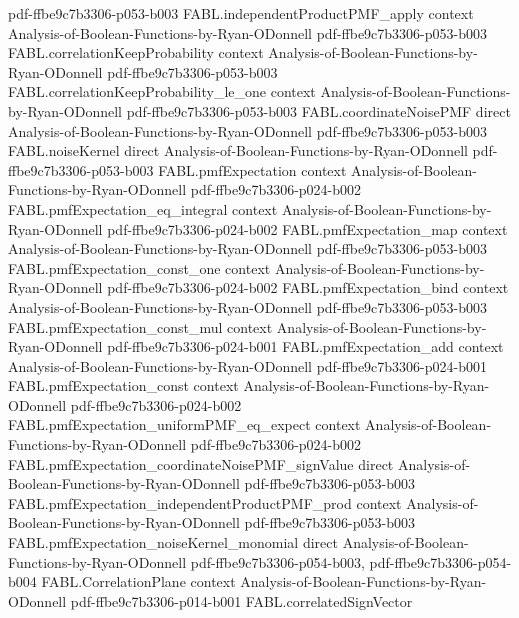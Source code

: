 \begin{theorem}
  {pdf-ffbe9c7b3306-p053-b003}
\proofstep
  {FABL.independentProductPMF_apply}
  {context}
  {Analysis-of-Boolean-Functions-by-Ryan-ODonnell}
  {pdf-ffbe9c7b3306-p053-b003}
\proofstep
  {FABL.correlationKeepProbability}
  {context}
  {Analysis-of-Boolean-Functions-by-Ryan-ODonnell}
  {pdf-ffbe9c7b3306-p053-b003}
\proofstep
  {FABL.correlationKeepProbability_le_one}
  {context}
  {Analysis-of-Boolean-Functions-by-Ryan-ODonnell}
  {pdf-ffbe9c7b3306-p053-b003}
\proofstep
  {FABL.coordinateNoisePMF}
  {direct}
  {Analysis-of-Boolean-Functions-by-Ryan-ODonnell}
  {pdf-ffbe9c7b3306-p053-b003}
\proofstep
  {FABL.noiseKernel}
  {direct}
  {Analysis-of-Boolean-Functions-by-Ryan-ODonnell}
  {pdf-ffbe9c7b3306-p053-b003}
\proofstep
  {FABL.pmfExpectation}
  {context}
  {Analysis-of-Boolean-Functions-by-Ryan-ODonnell}
  {pdf-ffbe9c7b3306-p024-b002}
\proofstep
  {FABL.pmfExpectation_eq_integral}
  {context}
  {Analysis-of-Boolean-Functions-by-Ryan-ODonnell}
  {pdf-ffbe9c7b3306-p024-b002}
\proofstep
  {FABL.pmfExpectation_map}
  {context}
  {Analysis-of-Boolean-Functions-by-Ryan-ODonnell}
  {pdf-ffbe9c7b3306-p053-b003}
\proofstep
  {FABL.pmfExpectation_const_one}
  {context}
  {Analysis-of-Boolean-Functions-by-Ryan-ODonnell}
  {pdf-ffbe9c7b3306-p024-b002}
\proofstep
  {FABL.pmfExpectation_bind}
  {context}
  {Analysis-of-Boolean-Functions-by-Ryan-ODonnell}
  {pdf-ffbe9c7b3306-p053-b003}
\proofstep
  {FABL.pmfExpectation_const_mul}
  {context}
  {Analysis-of-Boolean-Functions-by-Ryan-ODonnell}
  {pdf-ffbe9c7b3306-p024-b001}
\proofstep
  {FABL.pmfExpectation_add}
  {context}
  {Analysis-of-Boolean-Functions-by-Ryan-ODonnell}
  {pdf-ffbe9c7b3306-p024-b001}
\proofstep
  {FABL.pmfExpectation_const}
  {context}
  {Analysis-of-Boolean-Functions-by-Ryan-ODonnell}
  {pdf-ffbe9c7b3306-p024-b002}
\proofstep
  {FABL.pmfExpectation_uniformPMF_eq_expect}
  {context}
  {Analysis-of-Boolean-Functions-by-Ryan-ODonnell}
  {pdf-ffbe9c7b3306-p024-b002}
\proofstep
  {FABL.pmfExpectation_coordinateNoisePMF_signValue}
  {direct}
  {Analysis-of-Boolean-Functions-by-Ryan-ODonnell}
  {pdf-ffbe9c7b3306-p053-b003}
\proofstep
  {FABL.pmfExpectation_independentProductPMF_prod}
  {context}
  {Analysis-of-Boolean-Functions-by-Ryan-ODonnell}
  {pdf-ffbe9c7b3306-p053-b003}
\proofstep
  {FABL.pmfExpectation_noiseKernel_monomial}
  {direct}
  {Analysis-of-Boolean-Functions-by-Ryan-ODonnell}
  {pdf-ffbe9c7b3306-p054-b003,
    pdf-ffbe9c7b3306-p054-b004}
\proofstep
  {FABL.CorrelationPlane}
  {context}
  {Analysis-of-Boolean-Functions-by-Ryan-ODonnell}
  {pdf-ffbe9c7b3306-p014-b001}
\proofstep
  {FABL.correlatedSignVector}

\end{theorem}
